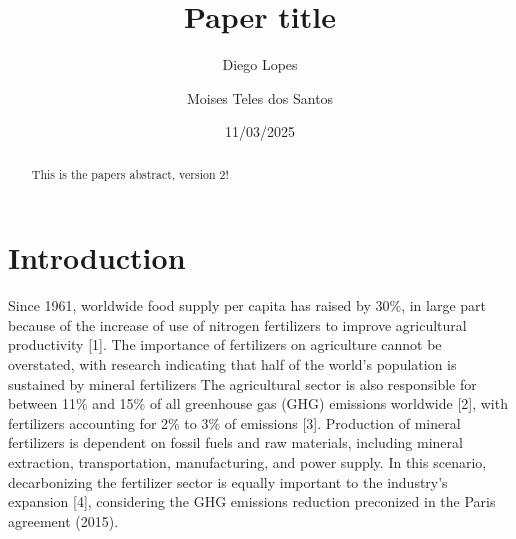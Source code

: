 \documentclass[a4paper, titlepage]{article}
\begin{document}
\title{Paper title}
\author{
	Diego Lopes\\
	\and
	Moises Teles dos Santos}
\date{11/03/2025}
\maketitle

\begin{abstract}
	This is the papers abstract, version 2!
\end{abstract}

\section{Introduction}
Since 1961, worldwide food supply per capita has raised by 30\%, in large part because of the increase of use of
nitrogen fertilizers to improve agricultural productivity [1]. The importance of fertilizers on agriculture cannot
be overstated, with research indicating that half of the world’s population is sustained by mineral fertilizers
The agricultural sector is also responsible for between 11\% and 15\% of all greenhouse gas (GHG)
emissions worldwide [2], with fertilizers accounting for 2\% to 3\% of emissions [3]. Production of mineral
fertilizers is dependent on fossil fuels and raw materials, including mineral extraction,
transportation, manufacturing, and power supply. In this scenario, decarbonizing the fertilizer sector is equally
important to the industry’s expansion [4], considering the GHG emissions reduction preconized in
the Paris agreement (2015).




\printbibliography{}
\end{document}
